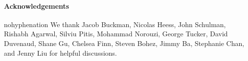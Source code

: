 \paragraph{Acknowledgements}

\begin{hyphenrules}{nohyphenation}
We thank Jacob Buckman, Nicolas Heess, John Schulman, Rishabh Agarwal, Silviu Pitis, Mohammad Norouzi, George Tucker, David Duvenaud, Shane Gu, Chelsea Finn, Steven Bohez, Jimmy Ba, Stephanie Chan, and Jenny Liu for helpful discussions.
\end{hyphenrules}
